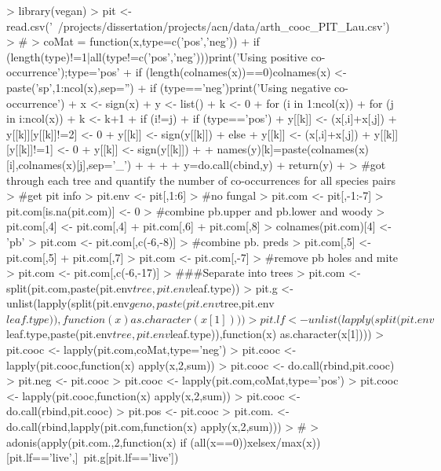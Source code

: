 \documentclass[12pt]{article}
\begin{document}
\begin{Schunk}
\begin{Sinput}
> library(vegan)
> pit <- read.csv('~/projects/dissertation/projects/acn/data/arth_cooc_PIT_Lau.csv')
>                                         #
> coMat = function(x,type=c('pos','neg')){
+   if (length(type)!=1|all(type!=c('pos','neg'))){print('Using positive co-occurrence');type='pos'}
+   if (length(colnames(x))==0){colnames(x) <- paste('sp',1:ncol(x),sep='')}
+   if (type=='neg'){print('Using negative co-occurrence')}
+   x <- sign(x)
+   y <- list()
+   k <- 0
+   for (i in 1:ncol(x)){
+     for (j in i:ncol(x)){
+       k <- k+1
+       if (i!=j){
+         if (type=='pos'){
+           y[[k]] <- (x[,i]+x[,j])
+           y[[k]][y[[k]]!=2] <- 0
+           y[[k]] <- sign(y[[k]])
+         }else{
+           y[[k]] <- (x[,i]+x[,j])
+           y[[k]][y[[k]]!=1] <- 0
+           y[[k]] <- sign(y[[k]])
+         }
+         names(y)[k]=paste(colnames(x)[i],colnames(x)[j],sep='_')
+       }
+     }
+   }
+   y=do.call(cbind,y)
+   return(y)
+ }
>                                         #got through each tree and quantify the number of co-occurrences for all species pairs
>                                         #get pit info
> pit.env <- pit[,1:6]
>                                         #no fungal
> pit.com <- pit[,-1:-7]
> pit.com[is.na(pit.com)] <- 0
>                                         #combine pb.upper and pb.lower and woody
> pit.com[,4] <- pit.com[,4] + pit.com[,6] + pit.com[,8]
> colnames(pit.com)[4] <- 'pb'
> pit.com <- pit.com[,c(-6,-8)]
>                                         #combine pb. preds
> pit.com[,5] <- pit.com[,5] + pit.com[,7] 
> pit.com <- pit.com[,-7]
>                                         #remove pb holes and mite
> pit.com <- pit.com[,c(-6,-17)]
> ###Separate into trees
> pit.com <- split(pit.com,paste(pit.env$tree,pit.env$leaf.type))
> pit.g <- unlist(lapply(split(pit.env$geno,paste(pit.env$tree,pit.env$leaf.type)),function(x) as.character(x[1])))
> pit.lf <- unlist(lapply(split(pit.env$leaf.type,paste(pit.env$tree,pit.env$leaf.type)),function(x) as.character(x[1])))
> pit.cooc <- lapply(pit.com,coMat,type='neg')
> pit.cooc <- lapply(pit.cooc,function(x) apply(x,2,sum))
> pit.cooc <- do.call(rbind,pit.cooc)
> pit.neg <- pit.cooc
> pit.cooc <- lapply(pit.com,coMat,type='pos')
> pit.cooc <- lapply(pit.cooc,function(x) apply(x,2,sum))
> pit.cooc <- do.call(rbind,pit.cooc)
> pit.pos <- pit.cooc
> pit.com. <- do.call(rbind,lapply(pit.com,function(x) apply(x,2,sum)))
>                                         #
> adonis(apply(pit.com.,2,function(x) if (all(x==0)){x}else{x/max(x)})[pit.lf=='live',]~pit.g[pit.lf=='live'])

\end{Sinput}
\end{Schunk}
\end{document}
